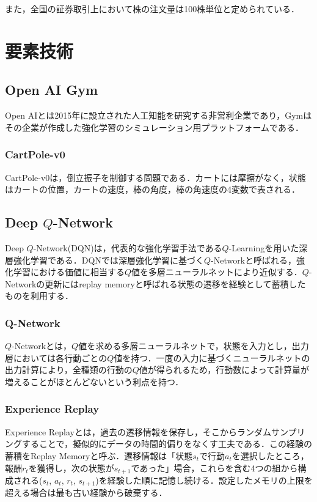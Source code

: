 \documentclass[twocolumn]{jarticle}
\begin{document}
    また，全国の証券取引上において株の注文量は100株単位と定められている．
\section{要素技術}
    \subsection{Open AI Gym}
    Open AIとは2015年に設立された人工知能を研究する非営利企業であり，Gymはその企業が作成した強化学習のシミュレーション用プラットフォームである．
        \subsubsection{CartPole-v0}
        CartPole-v0は，倒立振子を制御する問題である．カートには摩擦がなく，状態はカートの位置，カートの速度，棒の角度，棒の角速度の4変数で表される．

    \subsection{Deep $Q$-Network}
    Deep $Q$-Network(DQN)は，代表的な強化学習手法である$Q$-Learningを用いた深層強化学習である．DQNでは深層強化学習に基づく$Q$-Networkと呼ばれる，強化学習における価値に相当する$Q$値を多層ニューラルネットにより近似する．$Q$-Networkの更新にはreplay memoryと呼ばれる状態の遷移を経験として蓄積したものを利用する．

        \subsubsection{Q-Network}
        $Q$-Networkとは，$Q$値を求める多層ニューラルネットで，状態を入力とし，出力層においては各行動ごとの$Q$値を持つ．一度の入力に基づくニューラルネットの出力計算により，全種類の行動の$Q$値が得られるため，行動数によって計算量が増えることがほとんどないという利点を持つ．

        \subsubsection{Experience Replay}
        Experience Replayとは，過去の遷移情報を保存し，そこからランダムサンプリングすることで，擬似的にデータの時間的偏りをなくす工夫である．この経験の蓄積をReplay Memoryと呼ぶ．遷移情報は「状態$s_t$で行動$a_t$を選択したところ，報酬$r_t$を獲得し，次の状態が$s_{t+1}$であった」場合，これらを含む4つの組から構成される($s_t$, $a_t$, $r_t$, $s_{t+1}$)を経験した順に記憶し続ける．設定したメモリの上限を超える場合は最も古い経験から破棄する．
\end{document}
